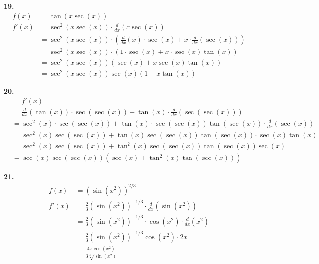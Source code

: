 \documentclass[10pt,oneside,]{book}
\theoremstyle{plain}
\theoremstyle{definition}
\numberwithin{equation}{section}
\newcommand{\fe}[2]{#1\mathopen{}\left(#2\right)\mathclose{}}
\newcommand{\fd}[1]{#1'}
\newcommand{\lzoo}[2]{{\frac{d}{d#1}}{\left(#2\right)}}
\begin{document}
\par\smallskip
\noindent\textbf{19.}\quad{}\begin{align*}
\fe{f}{x}&=\fe{\tan}{x\fe{\sec}{x}}\\
\fe{\fd{f}}{x}&=\fe{\sec^2}{x\fe{\sec}{x}}\cdot\lzoo{x}{x\fe{\sec}{x}}\\
&=\fe{\sec^2}{x\fe{\sec}{x}}\cdot\left(\lzoo{x}{x}\cdot\fe{\sec}{x}+x\cdot\lzoo{x}{\fe{\sec}{x}}\right)\\
&=\fe{\sec^2}{x\fe{\sec}{x}}\cdot\left(1\cdot\fe{\sec}{x}+x\cdot\fe{\sec}{x}\fe{\tan}{x}\right)\\
&=\fe{\sec^2}{x\fe{\sec}{x}}\left(\fe{\sec}{x}+x\fe{\sec}{x}\fe{\tan}{x}\right)\\
&=\fe{\sec^2}{x\fe{\sec}{x}}\fe{\sec}{x}\left(1+x\fe{\tan}{x}\right)
\end{align*}%
\par\smallskip
\noindent\textbf{20.}\quad{}\begin{align*}
&\phantom{{}={}}\fe{\fd{f}}{x}\\
&=\lzoo{x}{\fe{\tan}{x}}\cdot\fe{\sec}{\fe{\sec}{x}}+\fe{\tan}{x}\cdot\lzoo{x}{\fe{\sec}{\fe{\sec}{x}}}\\
&=\fe{\sec^2}{x}\cdot\fe{\sec}{\fe{\sec}{x}}+\fe{\tan}{x}\cdot\fe{\sec}{\fe{\sec}{x}}\fe{\tan}{\fe{\sec}{x}}\cdot\lzoo{x}{\fe{\sec}{x}}\\
&=\fe{\sec^2}{x}\fe{\sec}{\fe{\sec}{x}}+\fe{\tan}{x}\fe{\sec}{\fe{\sec}{x}}\fe{\tan}{\fe{\sec}{x}}\cdot\fe{\sec}{x}\fe{\tan}{x}\\
&=\fe{\sec^2}{x}\fe{\sec}{\fe{\sec}{x}}+\fe{\tan^2}{x}\fe{\sec}{\fe{\sec}{x}}\fe{\tan}{\fe{\sec}{x}}\fe{\sec}{x}\\
&=\fe{\sec}{x}\fe{\sec}{\fe{\sec}{x}}\left(\fe{\sec}{x}+\fe{\tan^2}{x}\fe{\tan}{\fe{\sec}{x}}\right)
\end{align*}%
\par\smallskip
\noindent\textbf{21.}\quad{}\begin{align*}
\fe{f}{x}&=\left(\fe{\sin}{x^2}\right)^{2/3}\\
\fe{\fd{f}}{x}&=\frac{2}{3}\left(\fe{\sin}{x^2}\right)^{-1/3}\cdot\lzoo{x}{\fe{\sin}{x^2}}\\
&=\frac{2}{3}\left(\fe{\sin}{x^2}\right)^{-1/3}\cdot\fe{\cos}{x^2}\cdot\lzoo{x}{x^2}\\
&=\frac{2}{3}\left(\fe{\sin}{x^2}\right)^{-1/3}\fe{\cos}{x^2}\cdot2x\\
&=\frac{4x\fe{\cos}{x^2}}{3\sqrt[3]{\fe{\sin}{x^2}}}
\end{align*}%
\par\smallskip
\end{document}
